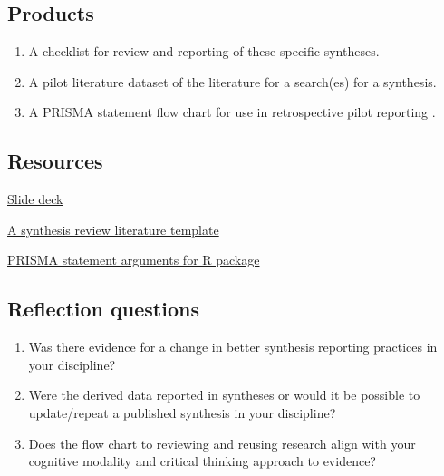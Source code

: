 \documentclass[
]{book}
\providecommand{\tightlist}{%
  \setlength{\itemsep}{0pt}\setlength{\parskip}{0pt}}
\begin{document}
\hypertarget{products-1}{%
\subsection*{Products}\label{products-1}}

\begin{enumerate}
\def\labelenumi{\arabic{enumi}.}
\tightlist
\item
  A checklist for review and reporting of these specific syntheses.\\
\item
  A pilot literature dataset of the literature for a search(es) for a synthesis.\\
\item
  A PRISMA statement flow chart for use in retrospective pilot reporting \citep{RN7348}.
\end{enumerate}

\hypertarget{resources-1}{%
\subsection*{Resources}\label{resources-1}}

\href{https://figshare.com/articles/presentation/Quantitative_synthesis_reporting/16608700}{Slide deck}

\href{https://figshare.com/articles/dataset/A_synthesis_review_literature_template/16608715}{A synthesis review literature template}

\href{https://figshare.com/articles/dataset/PRISMA_statement_arguments_for_R_package/16608721}{PRISMA statement arguments for R package}

\hypertarget{reflection-questions-1}{%
\subsection*{Reflection questions}\label{reflection-questions-1}}

\begin{enumerate}
\def\labelenumi{\arabic{enumi}.}
\tightlist
\item
  Was there evidence for a change in better synthesis reporting practices in your discipline?\\
\item
  Were the derived data reported in syntheses or would it be possible to update/repeat a published synthesis in your discipline?\\
\item
  Does the flow chart to reviewing and reusing research align with your cognitive modality and critical thinking approach to evidence?
\end{enumerate}
\end{document}

